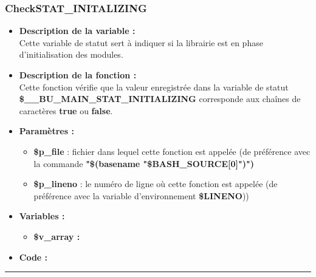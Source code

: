 \documentclass[a4paper,10pt]{article}
\begin{document}
\subsubsection{CheckSTAT\_INITALIZING}\color{white}
\begin{itemize}
    \item \textbf{Description de la variable :}\\
    Cette variable de statut sert à indiquer si la librairie est en phase d'initialisation des modules.\\[1\baselineskip]

    \item \textbf{Description de la fonction :}\\
        Cette fonction vérifie que la valeur enregistrée dans la variable de statut \textbf{\color{orange}\$\_\_BU\_MAIN\_STAT\_INITIALIZING} corresponde aux chaînes de caractères \textbf{true} ou \textbf{false}.\\[1\baselineskip]

    \item \textbf{Paramètres :}
    \begin{itemize}
        \item \color{orange}\textbf{\$p\_file}\color{white} : fichier dans lequel cette fonction est appelée (de préférence avec la commande \textbf{"\$(\color{gray}basename \color{white}"\color{orange}\$BASH\_SOURCE[0]\color{white}")")}\\[1\baselineskip]

        \item \color{orange}\textbf{\$p\_lineno}\color{white} : le numéro de ligne où cette fonction est appelée (de préférence avec la variable d'environnement \textbf{\color{orange}\$LINENO}))\\[1\baselineskip]
    \end{itemize}

    \item \textbf{Variables :}
    \begin{itemize}
        \item \textbf{\color{orange}\$v\_array\color{white} :}\\[1\baselineskip]
    \end{itemize}


    \item \textbf{Code :}
\end{itemize}


\color{blue}\par\noindent\rule{\textwidth}{0.4pt}\color{white}
\end{document}
